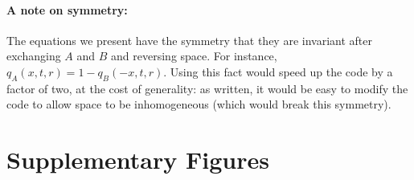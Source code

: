 \documentclass[11pt,letterpaper]{article}
\begin{document}
\paragraph{A note on symmetry:}
The equations we present have the symmetry that they are invariant after exchanging $A$ and $B$ and reversing space.
For instance, $q_A(x,t,r) = 1 - q_B(-x,t,r)$.
Using this fact would speed up the code by a factor of two,
at the cost of generality:
as written, it would be easy to modify the code to allow space to be inhomogeneous 
(which would break this symmetry).


\section{Supplementary Figures}


\singlespacing
{}
\end{document}

